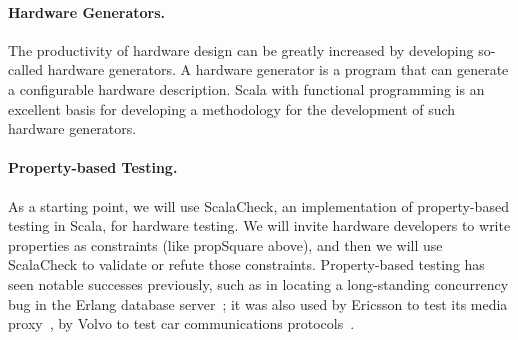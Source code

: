 \documentclass[fleqn,12pt]{article}
\begin{document}
\paragraph{Hardware Generators.}

The productivity of hardware design can be greatly increased by developing so-called
hardware generators. A hardware generator is a program that can generate a configurable
hardware description.
Scala with functional programming is an excellent basis for developing a methodology for the
development of such hardware generators.


\paragraph{Property-based Testing.}
As a starting point, we will use ScalaCheck, an implementation of
property-based testing in Scala, for hardware testing. We will invite
hardware developers to write properties as constraints (like
propSquare above), and then we will use ScalaCheck to validate or
refute those constraints. Property-based testing has seen notable
successes previously, such as in locating a long-standing concurrency
bug in the Erlang database server~\cite{DBLP:conf/erlang/HughesB11};
it was also used by Ericsson to test its media
proxy~\cite{DBLP:conf/erlang/ArtsHJW06}, by Volvo to test car
communications protocols~\cite{DBLP:conf/icst/ArtsHNS15}.
\end{document}
